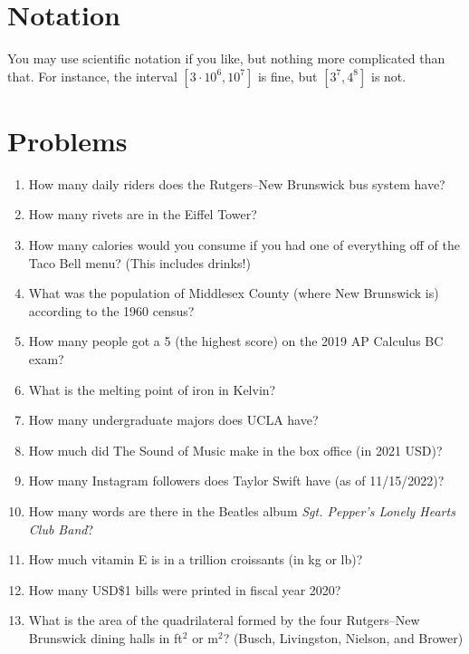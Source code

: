 \documentclass[12pt,letterpaper]{article}
\begin{document}
\section*{Notation}

You may use scientific notation if you like, but nothing more complicated than that. For instance, the interval \([3\cdot 10^6,10^7]\) is fine, but \([3^7,4^8]\) is not. 

\newpage

\section*{Problems}

\begin{enumerate}
	\itemsep 1.25em 
	\item How many daily riders does the Rutgers--New Brunswick bus system have?
	\item How many rivets are in the Eiffel Tower?
	\item How many calories would you consume if you had one of everything off of the Taco Bell menu? (This includes drinks!)
	\item What was the population of Middlesex County (where New Brunswick is) according to the 1960 census?
	\item How many people got a 5 (the highest score) on the 2019 AP Calculus BC exam?
	\item What is the melting point of iron in Kelvin?
	\item How many undergraduate majors does UCLA have?
	\item How much did The Sound of Music make in the box office (in 2021 USD)?
	\item How many Instagram followers does Taylor Swift have (as of 11/15/2022)?
	\item How many words are there in the Beatles album \textit{Sgt. Pepper's Lonely Hearts Club Band}?
	\item How much vitamin E is in a trillion croissants (in kg or lb)?
	\item How many USD\$1 bills were printed in fiscal year 2020?
	\item What is the area of the quadrilateral formed by the four Rutgers--New Brunswick dining halls in ft\(^2\) or m\(^2\)? (Busch, Livingston, Nielson, and Brower)
\end{enumerate}
\end{document}
